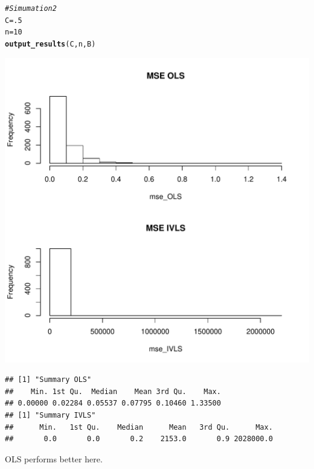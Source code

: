 \documentclass[11pt]{article}\usepackage[]{graphicx}\usepackage[]{color}
\makeatletter
\def\maxwidth{ %
  \ifdim\Gin@nat@width>\linewidth
    \linewidth
  \else
    \Gin@nat@width
  \fi
}
\newcommand{\hlnum}[1]{\textcolor[rgb]{0.686,0.059,0.569}{#1}}%
\newcommand{\hlcom}[1]{\textcolor[rgb]{0.678,0.584,0.686}{\textit{#1}}}%
\newcommand{\hlstd}[1]{\textcolor[rgb]{0.345,0.345,0.345}{#1}}%
\newcommand{\hlkwb}[1]{\textcolor[rgb]{0.69,0.353,0.396}{#1}}%
\newcommand{\hlkwd}[1]{\textcolor[rgb]{0.737,0.353,0.396}{\textbf{#1}}}%
\newenvironment{kframe}{%
 \def\at@end@of@kframe{}%
 \ifinner\ifhmode%
  \def\at@end@of@kframe{\end{minipage}}%
  \begin{minipage}{\columnwidth}%
 \fi\fi%
 \def\FrameCommand##1{\hskip\@totalleftmargin \hskip-\fboxsep
 \colorbox{shadecolor}{##1}\hskip-\fboxsep
     \hskip-\linewidth \hskip-\@totalleftmargin \hskip\columnwidth}%
 \MakeFramed {\advance\hsize-\width
   \@totalleftmargin\z@ \linewidth\hsize
   \@setminipage}}%
 {\par\unskip\endMakeFramed%
 \at@end@of@kframe}
\newenvironment{knitrout}{}{} %
\makeatother
\begin{document}
\begin{knitrout}
\color{fgcolor}\begin{kframe}
\begin{alltt}
\hlcom{# Simumation 2}
\hlstd{C}\hlkwb{=}\hlnum{.5}
\hlstd{n}\hlkwb{=}\hlnum{10}
\hlkwd{output_results}\hlstd{(C,n,B)}
\end{alltt}
\end{kframe}
\includegraphics[width=\maxwidth]{figure/unnamed-chunk-5-1} 
\begin{kframe}\begin{lstlisting}[basicstyle=\ttfamily,breaklines=true]
## [1] "Summary OLS"
##    Min. 1st Qu.  Median    Mean 3rd Qu.    Max. 
## 0.00000 0.02284 0.05537 0.07795 0.10460 1.33500 
## [1] "Summary IVLS"
##      Min.   1st Qu.    Median      Mean   3rd Qu.      Max. 
##       0.0       0.0       0.2    2153.0       0.9 2028000.0
\end{lstlisting}
\end{kframe}
\end{knitrout}
OLS performs better here.
\end{document}

